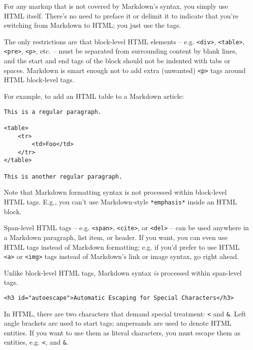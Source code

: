 For any markup that is not covered by Markdown's syntax, you simply
use HTML itself. There's no need to preface it or delimit it to
indicate that you're switching from Markdown to HTML; you just use
the tags.



The only restrictions are that block-level HTML elements -- e.g. \texttt{<div>},
\texttt{<table>}, \texttt{<pre>}, \texttt{<p>}, etc. -- must be separated from surrounding
content by blank lines, and the start and end tags of the block should
not be indented with tabs or spaces. Markdown is smart enough not
to add extra (unwanted) \texttt{<p>} tags around HTML block-level tags.



For example, to add an HTML table to a Markdown article:

\begin{lstlisting}
This is a regular paragraph.

<table>
    <tr>
        <td>Foo</td>
    </tr>
</table>

This is another regular paragraph.
\end{lstlisting}




Note that Markdown formatting syntax is not processed within block-level
HTML tags. E.g., you can't use Markdown-style \texttt{*emphasis*} inside an
HTML block.



Span-level HTML tags -- e.g. \texttt{<span>}, \texttt{<cite>}, or \texttt{<del>} -- can be
used anywhere in a Markdown paragraph, list item, or header. If you
want, you can even use HTML tags instead of Markdown formatting; e.g. if
you'd prefer to use HTML \texttt{<a>} or \texttt{<img>} tags instead of Markdown's
link or image syntax, go right ahead.



Unlike block-level HTML tags, Markdown syntax \emph{is} processed within
span-level tags.

\begin{lstlisting}<h3 id="autoescape">Automatic Escaping for Special Characters</h3>\end{lstlisting}




In HTML, there are two characters that demand special treatment: \texttt{<}
and \texttt{\&}. Left angle brackets are used to start tags; ampersands are
used to denote HTML entities. If you want to use them as literal
characters, you must escape them as entities, e.g. \texttt{<}, and
\texttt{\&}.



